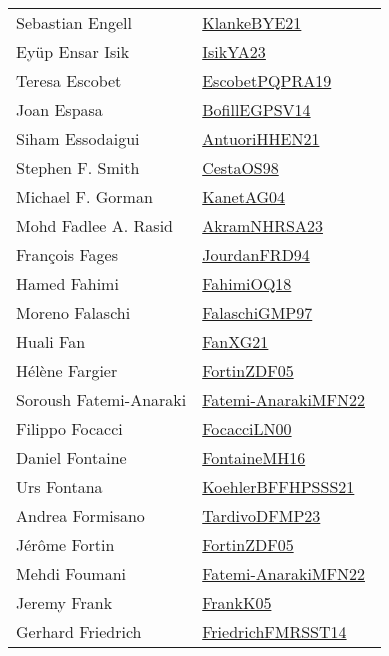 {\begin{longtable}{p{4cm}p{20cm}}
Sebastian Engell & \href{papers/KlankeBYE21.pdf}{KlankeBYE21}~\cite{KlankeBYE21}\\
Ey{\"{u}}p Ensar Isik & \href{articles/IsikYA23.pdf}{IsikYA23}~\cite{IsikYA23}\\
Teresa Escobet & \href{articles/EscobetPQPRA19.pdf}{EscobetPQPRA19}~\cite{EscobetPQPRA19}\\
Joan Espasa & \href{papers/BofillEGPSV14.pdf}{BofillEGPSV14}~\cite{BofillEGPSV14}\\
Siham Essodaigui & \href{papers/AntuoriHHEN21.pdf}{AntuoriHHEN21}~\cite{AntuoriHHEN21}\\
Stephen F. Smith & \href{papers/CestaOS98.pdf}{CestaOS98}~\cite{CestaOS98}\\
Michael F. Gorman & \href{}{KanetAG04}~\cite{KanetAG04}\\
Mohd Fadlee A. Rasid & \href{articles/AkramNHRSA23.pdf}{AkramNHRSA23}~\cite{AkramNHRSA23}\\
Fran{\c{c}}ois Fages & \href{}{JourdanFRD94}~\cite{JourdanFRD94}\\
Hamed Fahimi & \href{articles/FahimiOQ18.pdf}{FahimiOQ18}~\cite{FahimiOQ18}\\
Moreno Falaschi & \href{articles/FalaschiGMP97.pdf}{FalaschiGMP97}~\cite{FalaschiGMP97}\\
Huali Fan & \href{articles/FanXG21.pdf}{FanXG21}~\cite{FanXG21}\\
H{\'{e}}l{\`{e}}ne Fargier & \href{papers/FortinZDF05.pdf}{FortinZDF05}~\cite{FortinZDF05}\\
Soroush Fatemi-Anaraki & \href{}{Fatemi-AnarakiMFN22}~\cite{Fatemi-AnarakiMFN22}\\
Filippo Focacci & \href{papers/FocacciLN00.pdf}{FocacciLN00}~\cite{FocacciLN00}\\
Daniel Fontaine & \href{papers/FontaineMH16.pdf}{FontaineMH16}~\cite{FontaineMH16}\\
Urs Fontana & \href{articles/KoehlerBFFHPSSS21.pdf}{KoehlerBFFHPSSS21}~\cite{KoehlerBFFHPSSS21}\\
Andrea Formisano & \href{papers/TardivoDFMP23.pdf}{TardivoDFMP23}~\cite{TardivoDFMP23}\\
J{\'{e}}r{\^{o}}me Fortin & \href{papers/FortinZDF05.pdf}{FortinZDF05}~\cite{FortinZDF05}\\
Mehdi Foumani & \href{}{Fatemi-AnarakiMFN22}~\cite{Fatemi-AnarakiMFN22}\\
Jeremy Frank & \href{papers/FrankK05.pdf}{FrankK05}~\cite{FrankK05}\\
Gerhard Friedrich & \href{}{FriedrichFMRSST14}~\cite{FriedrichFMRSST14}\\

\end{longtable}}

